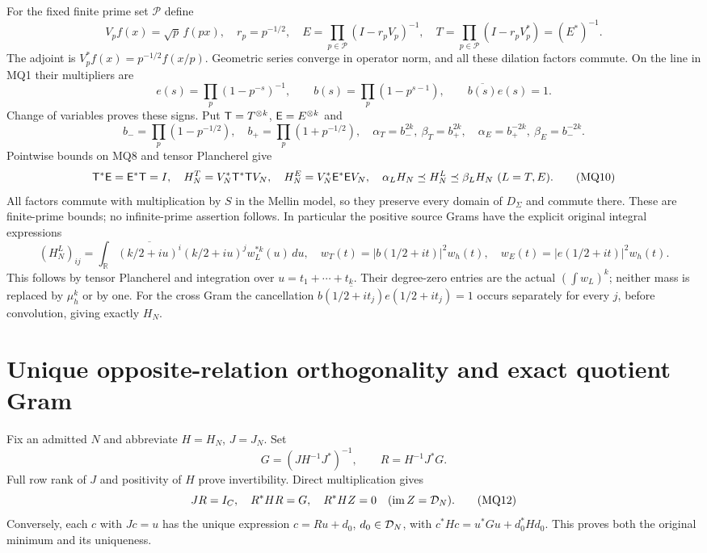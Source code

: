 \documentclass[11pt]{article}
\begin{document}
For the fixed finite prime set $\mathcal P$ define
\[
 V_pf(x)=\sqrt p\,f(px),\quad r_p=p^{-1/2},\quad
 E=\prod_{p\in\mathcal P}(I-r_pV_p)^{-1},\quad
 T=\prod_{p\in\mathcal P}(I-r_pV_p^*)=(E^*)^{-1}.             \tag{MQ7}
\]
The adjoint is $V_p^*f(x)=p^{-1/2}f(x/p)$. Geometric series
converge in operator norm, and all these dilation factors commute.
On the line in MQ1 their multipliers are
\[
 e(s)=\prod_p(1-p^{-s})^{-1},\qquad
 b(s)=\prod_p(1-p^{s-1}),\qquad \overline{b(s)}e(s)=1.
                                                               \tag{MQ8}
\]
Change of variables proves these signs. Put
$\mathsf T=T^{\otimes k}$, $\mathsf E=E^{\otimes k}$ and
\[
 b_-=\prod_p(1-p^{-1/2}),\quad b_+=\prod_p(1+p^{-1/2}),\quad
 \alpha_T=b_-^{2k},\ \beta_T=b_+^{2k},\quad
 \alpha_E=b_+^{-2k},\ \beta_E=b_-^{-2k}.                       \tag{MQ9}
\]
Pointwise bounds on MQ8 and tensor Plancherel give
\[
 \mathsf T^*\mathsf E=\mathsf E^*\mathsf T=I,\quad
 H_N^T=V_N^*\mathsf T^*\mathsf T V_N,\quad H_N^E=V_N^*\mathsf E^*\mathsf E V_N,
 \quad \alpha_LH_N\preceq H_N^L\preceq\beta_LH_N\ (L=T,E).
                                                               \tag{MQ10}
\]
All factors commute with multiplication by $S$ in the Mellin model,
so they preserve every domain of $D_\Sigma$ and commute there.
These are finite-prime bounds; no infinite-prime assertion follows.
In particular the positive source Grams have the explicit original
integral expressions
\[
 (H_N^L)_{ij}=\int_{\mathbb R}\overline{(k/2+iu)^i}
          (k/2+iu)^j w_L^{*k}(u)\,du,\quad
 w_T(t)=|b(1/2+it)|^2w_h(t),\quad
 w_E(t)=|e(1/2+it)|^2w_h(t).                              \tag{MQ10a}
\]
This follows by tensor Plancherel and integration over
$u=t_1+\cdots+t_k$. Their degree-zero entries are the actual
$(\int w_L)^k$; neither mass is replaced by $\mu_h^k$ or by one.
For the cross Gram the cancellation
$\overline{b(1/2+it_j)}e(1/2+it_j)=1$ occurs separately for
every $j$, before convolution, giving exactly $H_N$.

\section{Unique opposite-relation orthogonality and exact quotient Gram}
Fix an admitted $N$ and abbreviate $H=H_N$, $J=J_N$. Set
\[
 G=(JH^{-1}J^*)^{-1},\qquad R=H^{-1}J^*G.                    \tag{MQ11}
\]
Full row rank of $J$ and positivity of $H$ prove invertibility.
Direct multiplication gives
\[
 JR=I_C,\quad R^*HR=G,\quad R^*H Z=0
       \quad(\operatorname{im} Z=\mathcal D_N).                                 \tag{MQ12}
\]
Conversely, each $c$ with $Jc=u$ has the unique expression
$c=Ru+d_0$, $d_0\in\mathcal D_N$, with
$c^*Hc=u^*Gu+d_0^*Hd_0$. This proves both the original minimum
and its uniqueness.
\end{document}
